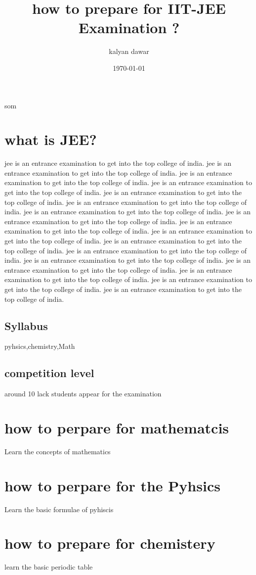 \documentclass[12pt]{article}
\title{how to prepare for IIT-JEE Examination ?}
\author{ kalyan dawar}
\date{\today}
\begin{document}
\maketitle

som
\section{what is JEE?}
jee is an entrance examination to get into the top college of india. jee is an entrance examination to get into the top college of india. jee is an entrance examination to get into the top college of india. jee is an entrance examination to get into the top college of india. jee is an entrance examination to get into the top college of india. jee is an entrance examination to get into the top college of india. jee is an entrance examination to get into the top college of india. jee is an entrance examination to get into the top college of india. jee is an entrance examination to get into the top college of india. jee is an entrance examination to get into the top college of india. jee is an entrance examination to get into the top college of india. jee is an entrance examination to get into the top college of india. jee is an entrance examination to get into the top college of india. jee is an entrance examination to get into the top college of india. jee is an entrance examination to get into the top college of india. jee is an entrance examination to get into the top college of india. jee is an entrance examination to get into the top college of india. 
\subsection{Syllabus}
pyhsics,chemistry,Math
\subsection{competition level}
around 10 lack students appear for the examination
\section{how to perpare for mathematcis}
Learn the concepts of mathematics
\section{how to perpare for the Pyhsics}
Learn the basic formulae of pyhiscis
\section{how to prepare for chemistery }
learn the basic periodic table

 
\end{document}
